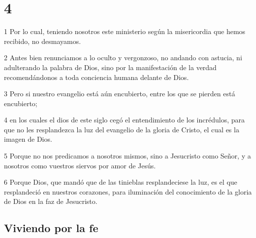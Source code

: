 \chapter{4}

\par 1 Por lo cual, teniendo nosotros este ministerio según la misericordia que hemos recibido, no desmayamos.
\par 2 Antes bien renunciamos a lo oculto y vergonzoso, no andando con astucia, ni adulterando la palabra de Dios, sino por la manifestación de la verdad recomendándonos a toda conciencia humana delante de Dios.
\par 3 Pero si nuestro evangelio está aún encubierto, entre los que se pierden está encubierto;
\par 4 en los cuales el dios de este siglo cegó el entendimiento de los incrédulos, para que no les resplandezca la luz del evangelio de la gloria de Cristo, el cual es la imagen de Dios.
\par 5 Porque no nos predicamos a nosotros mismos, sino a Jesucristo como Señor, y a nosotros como vuestros siervos por amor de Jesús.
\par 6 Porque Dios, que mandó que de las tinieblas resplandeciese la luz, es el que resplandeció en nuestros corazones, para iluminación del conocimiento de la gloria de Dios en la faz de Jesucristo.

\section*{Viviendo por la fe}

